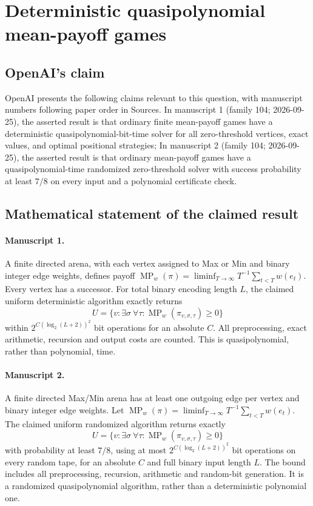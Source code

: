 \documentclass[11pt]{article}
\begin{document}
\section*{Deterministic quasipolynomial mean-payoff games}

\subsection{OpenAI's claim}
OpenAI presents the following claims relevant to this question, with manuscript numbers following paper order in Sources. In manuscript 1 (family 104; 2026-09-25), the asserted result is that ordinary finite mean-payoff games have a deterministic quasipolynomial-bit-time solver for all zero-threshold vertices, exact values, and optimal positional strategies; In manuscript 2 (family 104; 2026-09-25), the asserted result is that ordinary mean-payoff games have a quasipolynomial-time randomized zero-threshold solver with success probability at least $7/8$ on every input and a polynomial certificate check.

\subsection{Mathematical statement of the claimed result}
\paragraph{Manuscript 1.}
A finite directed arena, with each vertex assigned to Max or Min and binary integer edge weights, defines payoff $\operatorname{MP}_w(\pi)=\liminf_{T\to\infty}T^{-1}\sum_{t<T}w(e_t)$. Every vertex has a successor. For total binary encoding length $L$, the claimed uniform deterministic algorithm exactly returns
\[
 U=\{v:\exists\sigma\ \forall\tau:\operatorname{MP}_w(\pi_{v,\sigma,\tau})\ge0\}
\]
within $2^{C(\log_2(L+2))^2}$ bit operations for an absolute $C$. All preprocessing, exact arithmetic, recursion and output costs are counted. This is quasipolynomial, rather than polynomial, time.

\paragraph{Manuscript 2.}
A finite directed Max/Min arena has at least one outgoing edge per vertex and binary integer edge weights. Let $\operatorname{MP}_w(\pi)=\liminf_{T\to\infty}T^{-1}\sum_{t<T}w(e_t)$. The claimed uniform randomized algorithm returns exactly
\[
 U=\{v:\exists\sigma\ \forall\tau:\operatorname{MP}_w(\pi_{v,\sigma,\tau})\ge0\}
\]
with probability at least $7/8$, using at most $2^{C(\log_2(L+2))^2}$ bit operations on every random tape, for an absolute $C$ and full binary input length $L$. The bound includes all preprocessing, recursion, arithmetic and random-bit generation. It is a randomized quasipolynomial algorithm, rather than a deterministic polynomial one.
\end{document}
